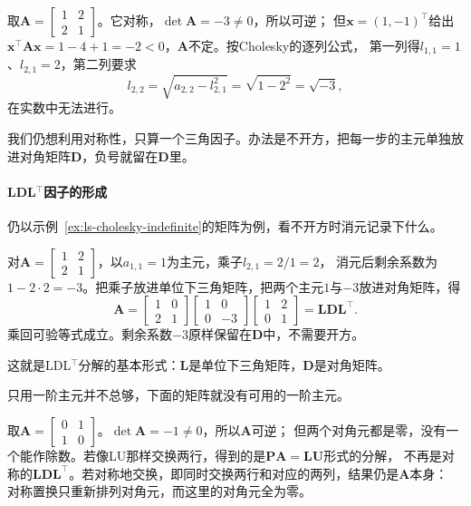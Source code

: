 \begin{example}[反例：不定矩阵的Cholesky中断]
\label{ex:ls-cholesky-indefinite}
取$\bm A=\left[\begin{smallmatrix}1&2\\2&1\end{smallmatrix}\right]$。它对称，$\det\bm A=-3\neq0$，所以可逆；
但$\bm x=(1,-1)^\top$给出$\bm x^\top\bm A\bm x=1-4+1=-2<0$，$\bm A$不定。按Cholesky的逐列公式，
第一列得$l_{1,1}=1$、$l_{2,1}=2$，第二列要求
\[
 l_{2,2}=\sqrt{a_{2,2}-l_{2,1}^2}=\sqrt{1-2^2}=\sqrt{-3},
\]
在实数中无法进行。
\end{example}

我们仍想利用对称性，只算一个三角因子。办法是不开方，把每一步的主元单独放进对角矩阵$\bm D$，负号就留在$\bm D$里。

\paragraph{LDL$^{\top}$因子的形成}

仍以示例~\ref{ex:ls-cholesky-indefinite}的矩阵为例，看不开方时消元记录下什么。

\begin{example}
\label{ex:ls-ldlt-two-by-two}
对$\bm A=\left[\begin{smallmatrix}1&2\\2&1\end{smallmatrix}\right]$，以$a_{1,1}=1$为主元，乘子$l_{2,1}=2/1=2$，
消元后剩余系数为$1-2\cdot2=-3$。把乘子放进单位下三角矩阵，把两个主元$1$与$-3$放进对角矩阵，得
\[
 \bm A=\begin{bmatrix}1&0\\2&1\end{bmatrix}
 \begin{bmatrix}1&0\\0&-3\end{bmatrix}
 \begin{bmatrix}1&2\\0&1\end{bmatrix}=\bm L\bm D\bm L^\top .
\]
乘回可验等式成立。剩余系数$-3$原样保留在$\bm D$中，不需要开方。
\end{example}

这就是LDL$^{\top}$分解的基本形式：$\bm L$是单位下三角矩阵，$\bm D$是对角矩阵。

只用一阶主元并不总够，下面的矩阵就没有可用的一阶主元。

\begin{example}[反例：没有一阶主元的对称可逆矩阵]
\label{ex:ls-no-scalar-pivot}
取$\bm A=\left[\begin{smallmatrix}0&1\\1&0\end{smallmatrix}\right]$。$\det\bm A=-1\neq0$，所以$\bm A$可逆；
但两个对角元都是零，没有一个能作除数。若像LU那样交换两行，得到的是$\bm P\bm A=\bm L\bm U$形式的分解，
不再是对称的$\bm L\bm D\bm L^\top$。若对称地交换，即同时交换两行和对应的两列，结果仍是$\bm A$本身：
对称置换只重新排列对角元，而这里的对角元全为零。
\end{example}

